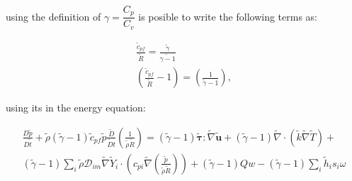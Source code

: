 \documentclass[preprint,12pt,authoryear]{elsarticle}
\begin{document}
using the definition of $\gamma=\dfrac{C_p}{C_v}$ is 
posible to write the  following terms as:

\begin{equation}
\begin{split}
	\frac{\tilde{c}_{pf}}{\tilde{R}}=\frac{\tilde{\gamma}}{\tilde{\gamma-1}}
	\\
        \left(
        	\frac{\tilde{c}_{pf}}{\tilde{R}}
		-1
        \right)
	=
        \left(
		\frac{1}{\tilde{\gamma}-1}
        \right),
	\label{cp}
\end{split}
\end{equation}

using its in the energy equation:  

\begin{equation}
\begin{split}
        \frac{D \tilde{p}}{D\tilde{t}}
	+
        \tilde{\rho}
	(\tilde{\gamma}-1)
        \tilde{c}_{pf}
        \tilde{p} 
        \frac{\tilde{D}}{\tilde{D} t}
        \left(
                \frac{1}{\tilde{\rho}\tilde{R}}
        \right)
        =
	(\tilde{\gamma}-1)
        \pmb{\tilde{\tau}}:\tilde{\nabla} \tilde{\mathbf{u}} 
	+
	(\tilde{\gamma}-1)
        \tilde{\nabla} \cdot (\tilde{k}\tilde{\nabla} \tilde{T})
        +
	\\
	(\tilde{\gamma}-1)
        \sum\limits_i 
        \tilde{\rho}
        \mathcal{D}_{im}
        \tilde{\nabla}
        \tilde{Y}_i     
        \cdot
        \left(
                c_{pi}
                \tilde{\nabla}
                \left(
                	\frac{\tilde{p}}{\tilde{\rho}\tilde{R}}
                \right)
        \right)
	+
	(\tilde{\gamma}-1)
	Qw
	-
	(\tilde{\gamma}-1)
        \sum\limits_i
	\tilde{h}_i
        s_i \omega	
\end{split}
\end{equation}
\end{document}
